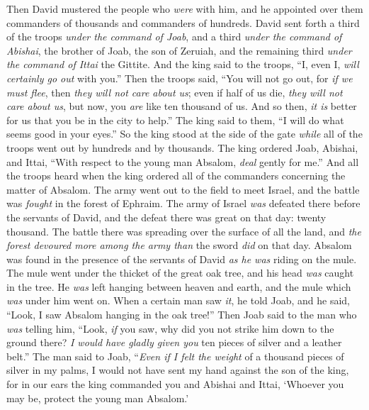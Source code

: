 \begin{biblechapter} %
 Then David mustered the people who \textit{were} with him, and he appointed over them commanders of thousands and commanders of hundreds.
\verse David sent forth a third of the troops \textit{under the command of Joab}, and a third \textit{under the command of Abishai}, the brother of Joab, the son of Zeruiah, and the remaining third \textit{under the command of Ittai} the Gittite. And the king said to the troops, “I, even I, \textit{will certainly go out} with you.”
\verse Then the troops said, “You will not go out, for \textit{if we must flee}, then \textit{they will not care about us}; even if half of us die, \textit{they will not care about us}, but now, you \textit{are} like ten thousand of us. And so then, \textit{it is} better for us that you be in the city to help.”
\verse The king said to them, “I will do what seems good in your eyes.” So the king stood at the side of the gate \textit{while} all of the troops went out by hundreds and by thousands.
\verse The king ordered Joab, Abishai, and Ittai, “With respect to the young man Absalom, \textit{deal} gently for me.” And all the troops heard when the king ordered all of the commanders concerning the matter of Absalom.
\verse The army went out to the field to meet Israel, and the battle was \textit{fought} in the forest of Ephraim.
\verse The army of Israel \textit{was} defeated there before the servants of David, and the defeat there was great on that day: twenty thousand.
\verse The battle there was spreading over the surface of all the land, and \textit{the forest devoured more among the army than} the sword \textit{did} on that day.
\verse Absalom was found in the presence of the servants of David \textit{as he was} riding on the mule. The mule went under the thicket of the great oak tree, and his head \textit{was} caught in the tree. He \textit{was} left hanging between heaven and earth, and the mule which \textit{was} under him went on.
\verse When a certain man saw \textit{it}, he told Joab, and he said, “Look, I saw Absalom hanging in the oak tree!”
\verse Then Joab said to the man who \textit{was} telling him, “Look, \textit{if} you saw, why did you not strike him down to the ground there? \textit{I would have gladly given you} ten pieces of silver and a leather belt.”
\verse The man said to Joab, “\textit{Even if I felt the weight} of a thousand pieces of silver in my palms, I would not have sent my hand against the son of the king, for in our ears the king commanded you and Abishai and Ittai, ‘Whoever you may be, protect the young man Absalom.’

\end{biblechapter}
